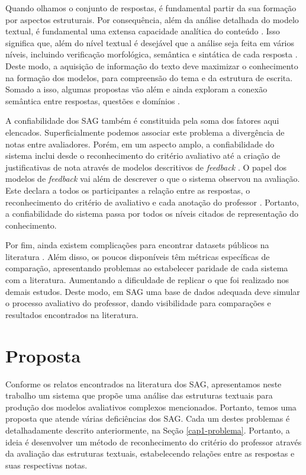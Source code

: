 Quando olhamos o conjunto de respostas, é fundamental partir da sua formação por aspectos estruturais. Por consequência, além da análise detalhada do modelo textual, é fundamental uma extensa capacidade analítica do conteúdo \cite{saha2018}. Isso significa que, além do nível textual é desejável que a análise seja feita em vários níveis, incluindo verificação morfológica, semântica e sintática de cada resposta \cite{sakaguchi2015, riordan2019, sahu2020}. Deste modo, a aquisição de informação do texto deve maximizar o conhecimento na formação dos modelos, para compreensão do tema e da estrutura de escrita. Somado a isso, algumas propostas vão além e ainda exploram a conexão semântica entre respostas, questões e domínios \cite{dzikovska2013, saha2019}.

A confiabilidade dos SAG também é constituida pela soma dos fatores aqui elencados. Superficialmente podemos associar este problema a divergência de notas entre avaliadores. Porém, em um aspecto amplo, a confiabilidade do sistema inclui desde o reconhecimento do critério avaliativo até a criação de justificativas de nota através de modelos descritivos de \textit{feedback} \cite{kumar2019}. O papel dos modelos de \textit{feedback} vai além de descrever o que o sistema observou na avaliação. Este declara a todos os participantes a relação entre as respostas, o reconhecimento do critério de avaliativo e cada anotação do professor \cite{marvaniya2018, bernius2022}. Portanto, a confiabilidade do sistema passa por todos os níveis citados de representação do conhecimento.

Por fim, ainda existem complicações para encontrar datasets públicos na literatura \cite{burrows2015}. Além disso, os poucos disponíveis têm métricas específicas de comparação, apresentando problemas ao estabelecer paridade de cada sistema com a literatura. Aumentando a dificuldade de replicar o que foi realizado nos demais estudos. Deste modo, em SAG uma base de dados adequada deve simular o processo avaliativo do professor, dando visibilidade para comparações e resultados encontrados na literatura.


\section{Proposta}
\label{cap1-proposta}

Conforme os relatos encontrados na literatura dos SAG, apresentamos neste trabalho um sistema que propõe uma análise das estruturas textuais para produção dos modelos avaliativos complexos mencionados. Portanto, temos uma proposta que atende várias deficiências dos SAG. Cada um destes problemas é detalhadamente descrito anteriormente, na Seção \ref{cap1-problema}. Portanto, a ideia é desenvolver um método de reconhecimento do critério do professor através da avaliação das estruturas textuais, estabelecendo relações entre as respostas e suas respectivas notas.

